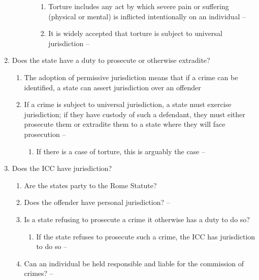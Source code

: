 \begin{enumerate}
\begin{enumerate}
\begin{enumerate}
\begin{enumerate}
            \item Torture includes any act by which severe pain or suffering (physical or mental) is inflicted intentionally on an individual -- 
            \item It is widely accepted that torture is subject to universal jurisdiction -- 
        \end{enumerate}
        \end{enumerate}
    \end{enumerate}
    \item Does the state have a duty to prosecute or otherwise extradite?
    \begin{enumerate}
        \item The adoption of permissive jurisdiction means that if a crime can be identified, a state can assert jurisdiction over an offender
        \item If a crime is subject to universal jurisdiction, a state must exercise jurisdiction; if they have custody of such a defendant, they must either prosecute them or extradite them to a state where they will face prosecution -- 
        \begin{enumerate}
            \item If there is a case of torture, this is arguably the case -- 
        \end{enumerate}
    \end{enumerate}
    \item Does the ICC have jurisdiction?
    \begin{enumerate}
        \item Are the states party to the Rome Statute?
        \item Does the offender have personal jurisdiction? -- 
        \item Is a state refusing to prosecute a crime it otherwise has a duty to do so?
        \begin{enumerate}
            \item If the state refuses to prosecute such a crime, the ICC has jurisdiction to do so -- 
        \end{enumerate}
        \item Can an individual be held responsible and liable for the commission of crimes? -- 

\end{enumerate}
\end{enumerate}
